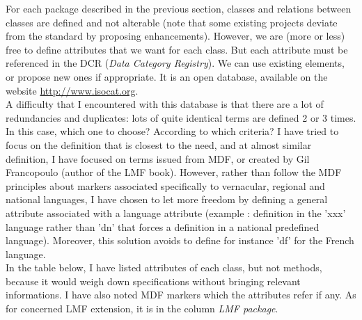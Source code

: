 \documentclass[a4paper,12pt]{article}
\begin{document}
For each package described in the previous section, classes and relations between classes are defined and not alterable (note that some existing projects deviate from the standard by proposing enhancements). However, we are (more or less) free to define attributes that we want for each class. But each attribute must be referenced in the DCR (\textit{Data Category Registry}). We can use existing elements, or propose new ones if appropriate. It is an open database, available on the website \url{http://www.isocat.org}.\\
A difficulty that I encountered with this database is that there are a lot of redundancies and duplicates: lots of quite identical terms are defined 2 or 3 times. In this case, which one to choose? According to which criteria? I have tried to focus on the definition that is closest to the need, and at almost similar definition, I have focused on terms issued from MDF, or created by Gil Francopoulo (author of the LMF book). However, rather than follow the MDF principles about markers associated specifically to vernacular, regional and national languages, I have chosen to let more freedom by defining a general attribute associated with a language attribute (example : definition in the 'xxx' language rather than 'dn' that forces a definition in a national predefined language). Moreover, this solution avoids to define for instance 'df' for the French language.\\

In the table below, I have listed attributes of each class, but not methods, because it would weigh down specifications without bringing relevant informations. I have also noted MDF markers which the attributes refer if any. As for concerned LMF extension, it is in the column \textit{LMF package}.

\pagebreak
\end{document}
